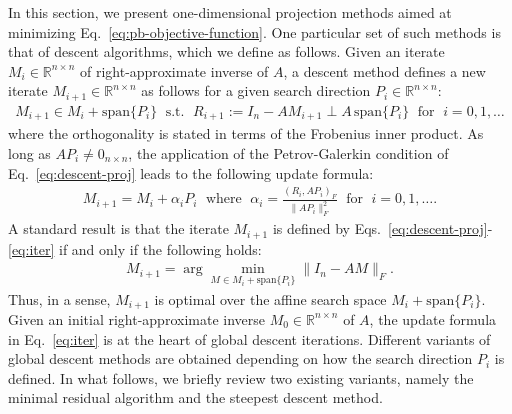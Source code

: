 \documentclass[numbers,webpdf,imanum]{ima-authoring-template}%
\theoremstyle{thmstyletwo}%
\numberwithin{equation}{section}
\begin{document}
In this section, we present one-dimensional projection methods aimed at minimizing Eq.~\eqref{eq:pb-objective-function}.
One particular set of such methods is that of descent algorithms, which we define as follows.
Given an iterate $M_i\in\mathbb{R}^{n\times n}$  of right-approximate inverse of $A$, a descent method defines a new iterate $M_{i+1}\in\mathbb{R}^{n\times n}$ as follows for a given search direction $P_i\in\mathbb{R}^{n\times n}$:
\begin{align}\label{eq:descent-proj}
M_{i+1}\in M_i+\text{span}\{P_i\}
\;\text{ s.t. }\;
R_{i+1}:=I_n-AM_{i+1}\perp A\,\text{span}\{P_i\}
\;\text{ for }\;
i=0,1,\dots
\end{align}
where the orthogonality is stated in terms of the Frobenius inner product.
As long as $AP_i\neq 0_{n\times n}$, the application of the Petrov-Galerkin condition of Eq.~\eqref{eq:descent-proj} leads to the following update formula:
\begin{align}\label{eq:iter}
M_{i+1}=M_i+\alpha_i P_i
\;\text{ where }\;
\alpha_i=\frac{(R_i,AP_i)_F}{\|AP_i\|_F^2}
\;\text{ for }\;
i=0,1,\dots.
\end{align}
A standard result is that the iterate $M_{i+1}$ is defined by Eqs.~\eqref{eq:descent-proj}-\eqref{eq:iter} if and only if the following holds:
\begin{align}\label{eq:descent-opt}
M_{i+1}=\arg\min_{M\in M_i+\text{span}\{P_i\}}\|I_n-AM\|_F.
\end{align}
Thus, in a sense, $M_{i+1}$ is optimal over the affine search space $M_i+\text{span}\{P_i\}$.
Given an initial right-approximate inverse $M_0\in\mathbb{R}^{n\times n}$ of $A$, the update formula in Eq.~\eqref{eq:iter} is at the heart of global descent iterations.
Different variants of global descent methods are obtained depending on how the search direction $P_i$ is defined.
In what follows, we briefly review two existing variants, namely the minimal residual algorithm and the steepest descent method.
\end{document}
